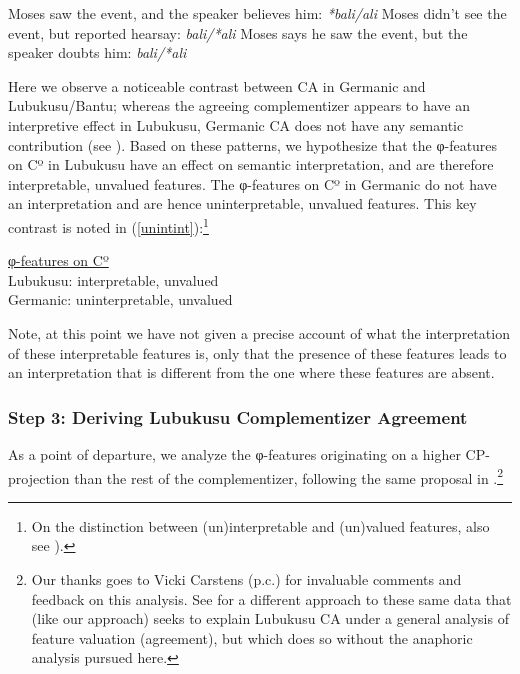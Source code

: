 \begin{xlist}
\ex Moses saw the event, and the speaker believes him: \textit{*bali/ali}
\ex Moses didn't see the event, but reported hearsay: \textit{bali/*ali}
\ex Moses says he saw the event, but the speaker doubts him: \textit{bali/*ali}

\end{xlist}

\z
\noindent
Here we observe a noticeable contrast between CA in Germanic and Lubukusu/Bantu; whereas the agreeing complementizer appears to have an interpretive effect in Lubukusu, Germanic CA does not have any semantic contribution (see \citealt{vanKoppen:2005,vanKoppen:2017}). Based on these patterns, we hypothesize that the φ-features on Cº in Lubukusu have an effect on semantic interpretation, and are therefore interpretable, unvalued features. The φ-features on Cº in Germanic do not have an interpretation and are hence uninterpretable, unvalued features. This key contrast is noted in (\ref{unintint}):\footnote{On the distinction between (un)interpretable and (un)valued features, also see  \citet{Pesetsky:2007}).}

\ea \label{unintint}

\underline{φ-features on Cº} \\
Lubukusu: interpretable, unvalued \\
Germanic: uninterpretable, unvalued

\z

Note, at this point we have not given a precise account of what the interpretation of these interpretable features is, only that the presence of these features leads to an interpretation that is different from the one where these features are absent.   

\subsubsection{Step 3: Deriving Lubukusu Complementizer Agreement}

As a point of departure, we analyze the φ-features originating on a higher CP-projection than the rest of the complementizer, following the same proposal in \citet{Carstens:2016}.\footnote{Our thanks goes to Vicki Carstens (p.c.) for invaluable comments and feedback on this analysis. See \citet{Carstens:2016} for a different approach to these same data that (like our approach) seeks to explain Lubukusu CA under a general analysis of feature valuation (agreement), but which does so without the anaphoric analysis pursued here.}

